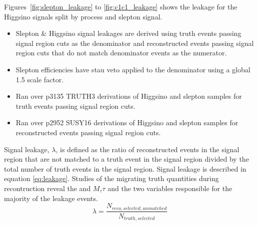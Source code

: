 Figures~\ref{fig:slepton_leakage} to \ref{fig:c1c1_leakage} shows
the leakage for the Higgsino signals split by process and slepton signal.

\begin{itemize}
\item Slepton \& Higgsino signal leakages are derived using truth events passing signal region cuts as the denominator and reconstructed events passing signal region cuts that do not match denominator events as the numerator.
\item Slepton efficiencies have stau veto applied to the denominator using a global 1.5 scale factor.
\item Ran over p3135 TRUTH3 derivations of Higgsino and slepton samples for truth events passing signal region cuts.
\item Ran over p2952 SUSY16 derivations of Higgsino and slepton samples for reconstructed events passing signal region cuts.
\end{itemize}


Signal leakage, $\lambda$, is defined as the ratio of reconstructed events in the signal region that are not matched to a truth event in the signal region divided by the total number of truth events in the signal region. Signal leakage is described in equation \ref{eq:leakage}.  Studies of the migrating truth quantities during recontruction reveal the \met{} and $M_\tau\tau$ and the two variables responsible for the majority of the leakage events.\\
\begin{equation}
\lambda = \frac{N_{reco,selected,unmatched}}{N_{truth,selected}}
\label{eq:leakage}
\end{equation}
\FloatBarrier

